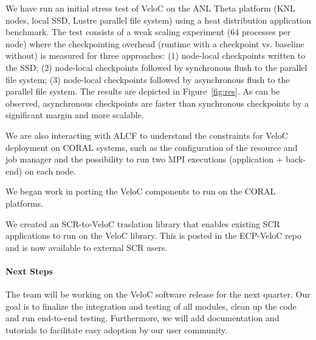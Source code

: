 We have run an initial stress test of VeloC on the ANL Theta platform
(KNL nodes, local SSD, Lustre parallel file system) using a heat
distribution application benchmark. The test consists of a weak
scaling experiment (64 processes per node) where the checkpointing
overhead (runtime with a checkpoint vs. baseline without) is measured
for three approaches: (1) node-local checkpoints written to the SSD;
(2) node-local checkpoints followed by synchronous flush to the
parallel file system; (3) node-local checkpoints followed by
asynchronous flush to the parallel file system.  The results are
depicted in Figure~\ref{fig:res}. As can be observed, asynchronous
checkpoints are faster than synchronous checkpoints by a significant
margin and more scalable.

We are also interacting with ALCF to understand the constraints for
VeloC deployment on CORAL systems, such as the configuration of the
resource and job manager and the possibility to run two MPI executions
(application + back-end) on each node.

We began work in porting the VeloC components to run on the CORAL
platforms.

We created an SCR-to-VeloC traslation library that enables existing
SCR applications to run on the VeloC library.  This is posted
in the ECP-VeloC repo and is now available to external SCR users.

\paragraph{Next Steps}


The team will be working on the VeloC software release for the next quarter.
Our goal is to finalize the integration and testing of all modules, clean up
the code and run end-to-end testing. Furthermore, we will add documentation
and tutorials to facilitate easy adoption by our user community.
